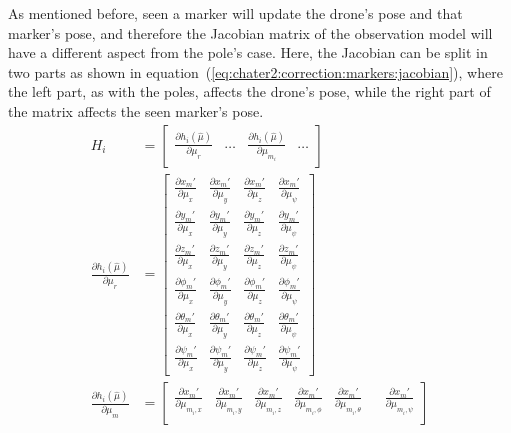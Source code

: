 As mentioned before, seen a marker will update the drone's pose and that marker's pose, and therefore the Jacobian matrix of the observation model will have a different aspect from the pole's case. Here, the Jacobian can be split in two parts as shown in equation~(\ref{eq:chater2:correction:markers:jacobian}), where the left part, as with the poles, affects the drone's pose, while the right part of the matrix affects the seen marker's pose.
\begin{align}
    H_i &= \begin{bmatrix}
        \frac{\partial h_i(\hat\mu)}{\partial \mu_r} & \dots & \frac{\partial h_i(\hat\mu)}{\partial \mu_{m_i}} & \dots
    \end{bmatrix}
    \label{eq:chater2:correction:markers:jacobian}\\
    \frac{\partial h_i(\hat\mu)}{\partial \mu_r} &= \begin{bmatrix}
        \frac{\partial x_m'}{\partial \mu_x} & \frac{\partial x_m'}{\partial \mu_y} & \frac{\partial x_m'}{\partial \mu_z} & \frac{\partial x_m'}{\partial \mu_{\psi}}\\
        \frac{\partial y_m'}{\partial \mu_x} & \frac{\partial y_m'}{\partial \mu_y} & \frac{\partial y_m'}{\partial \mu_z} & \frac{\partial y_m'}{\partial \mu_{\psi}}\\
        \frac{\partial z_m'}{\partial \mu_x} & \frac{\partial z_m'}{\partial \mu_y} & \frac{\partial z_m'}{\partial \mu_z} & \frac{\partial z_m'}{\partial \mu_{\psi}}\\
        \frac{\partial \phi_m'}{\partial \mu_x} & \frac{\partial \phi_m'}{\partial \mu_y} & \frac{\partial \phi_m'}{\partial \mu_z} & \frac{\partial \phi_m'}{\partial \mu_{\psi}}\\
        \frac{\partial \theta_m'}{\partial \mu_x} & \frac{\partial \theta_m'}{\partial \mu_y} & \frac{\partial \theta_m'}{\partial \mu_z} & \frac{\partial \theta_m'}{\partial \mu_{\psi}}\\
        \frac{\partial \psi_m'}{\partial \mu_x} & \frac{\partial \psi_m'}{\partial \mu_y} & \frac{\partial \psi_m'}{\partial \mu_z} & \frac{\partial \psi_m'}{\partial \mu_{\psi}}
    \end{bmatrix}
    \label{eq:chater2:correction:markers:jacobian_wrt_state}\\
    \frac{\partial h_i(\hat\mu)}{\partial \mu_m} &= \begin{bmatrix}
        \frac{\partial x_m'}{\partial \mu_{m_i, x}} & \frac{\partial x_m'}{\partial \mu_{m_i, y}} & \frac{\partial x_m'}{\partial \mu_{m_i, z}} & \frac{\partial x_m'}{\partial \mu_{m_i, \phi}} & \frac{\partial x_m'}{\partial \mu_{m_i, \theta}} & & \frac{\partial x_m'}{\partial \mu_{m_i, \psi}}\\

\end{bmatrix}
\end{align}
